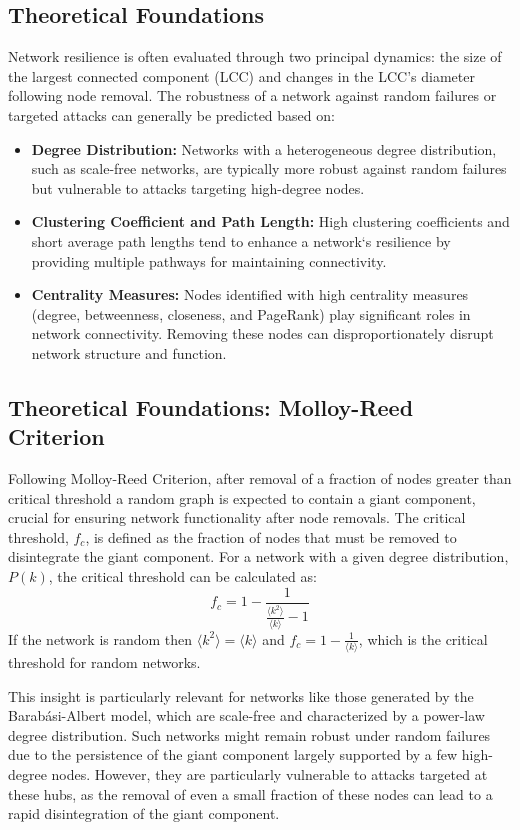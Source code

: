\documentclass[
	report, %
	11pt, %
]{CSUniSchoolLabReport}
\newcounter{ct}
\begin{document}
\subsection{Theoretical Foundations}
Network resilience is often evaluated through two principal dynamics: the size of the largest connected component (LCC) and changes in the LCC's diameter following node removal. The robustness of a network against random failures or targeted attacks can generally be predicted based on:
\begin{itemize}
    \item \textbf{Degree Distribution:} Networks with a heterogeneous degree distribution, such as scale-free networks, are typically more robust against random failures but vulnerable to attacks targeting high-degree nodes.
    \item \textbf{Clustering Coefficient and Path Length:} High clustering coefficients and short average path lengths tend to enhance a network`s resilience by providing multiple pathways for maintaining connectivity.
    \item \textbf{Centrality Measures:} Nodes identified with high centrality measures (degree, betweenness, closeness, and PageRank) play significant roles in network connectivity. Removing these nodes can disproportionately disrupt network structure and function.
\end{itemize}
\subsection{Theoretical Foundations: Molloy-Reed Criterion}
Following Molloy-Reed Criterion, after removal of a fraction of nodes greater than critical threshold a random graph is expected to contain a giant component, crucial for ensuring network functionality after node removals. The critical threshold, $f_c$, is defined as the fraction of nodes that must be removed to disintegrate the giant component. For a network with a given degree distribution, $P(k)$, the critical threshold can be calculated as:
\begin{equation}
    f_c = 1 - \frac{1}{
		\frac{\langle k^2 \rangle}
			{\langle k \rangle} - 1}
\end{equation}
If the network is random then $\langle k^2 \rangle = \langle k \rangle$ and $f_c = 1 - \frac{1}{\langle k \rangle}$, which is the critical threshold for random networks.\par
This insight is particularly relevant for networks like those generated by the Barabási-Albert model, which are scale-free and characterized by a power-law degree distribution. Such networks might remain robust under random failures due to the persistence of the giant component largely supported by a few high-degree nodes. However, they are particularly vulnerable to attacks targeted at these hubs, as the removal of even a small fraction of these nodes can lead to a rapid disintegration of the giant component.\par
\end{document}
